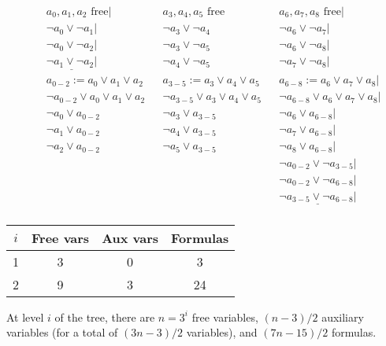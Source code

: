 \documentclass{article}
\begin{document}
\begin{align*}
  && a_0, a_1, a_2 \text{ free}|
  && a_3, a_4, a_5 \text{ free}
  && a_6, a_7, a_8 \text{ free}| \\
  && \lnot a_0 \lor \lnot a_1|
  && \lnot a_3 \lor \lnot a_4
  && \lnot a_6 \lor \lnot a_7| \\
  && \lnot a_0 \lor \lnot a_2|
  && \lnot a_3 \lor \lnot a_5
  && \lnot a_6 \lor \lnot a_8| \\
  && \underline{\lnot a_1 \lor \lnot a_2|}
  && \lnot a_4 \lor \lnot a_5
  && \lnot a_7 \lor \lnot a_8| \\
  && a_{0-2} := a_0 \lor a_1 \lor a_2
  && a_{3-5} := a_3 \lor a_4 \lor a_5
  && a_{6-8} := a_6 \lor a_7 \lor a_8| \\
  && \lnot a_{0-2} \lor a_0 \lor a_1 \lor a_2
  && \lnot a_{3-5} \lor a_3 \lor a_4 \lor a_5
  && \lnot a_{6-8} \lor a_6 \lor a_7 \lor a_8| \\
  && \lnot a_0 \lor a_{0-2}
  && \lnot a_3 \lor a_{3-5}
  && \lnot a_6 \lor a_{6-8}| \\
  && \lnot a_1 \lor a_{0-2}
  && \lnot a_4 \lor a_{3-5}
  && \lnot a_7 \lor a_{6-8}| \\
  && \lnot a_2 \lor a_{0-2}
  && \lnot a_5 \lor a_{3-5}
  && \lnot a_8 \lor a_{6-8}| \\
  && && && \lnot a_{0-2} \lor \lnot a_{3-5}| \\
  && && && \lnot a_{0-2} \lor \lnot a_{6-8}| \\
  && && && \underline{\lnot a_{3-5} \lor \lnot a_{6-8}|} \\
\end{align*}
\begin{center}
  \begin{tabular}{|c|c|c|c|}
    \hline
    $i$ & Free vars & Aux vars & Formulas \\ \hline
    1 & 3 & 0 & 3 \\ \hline
    2 & 9 & 3 & 24 \\ \hline
  \end{tabular}
\end{center}

At level $i$ of the tree,
there are $n=3^i$ free variables,
$(n-3)/2$ auxiliary variables
(for a total of $(3n-3)/2$ variables),
and $(7n-15)/2$ formulas.
\end{document}
